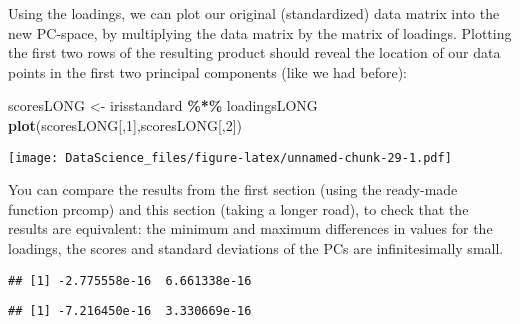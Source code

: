 \documentclass[
]{book}
\newenvironment{Shaded}{\begin{snugshade}}{\end{snugshade}}
\newcommand{\DecValTok}[1]{\textcolor[rgb]{0.00,0.00,0.81}{#1}}
\newcommand{\KeywordTok}[1]{\textcolor[rgb]{0.13,0.29,0.53}{\textbf{#1}}}
\newcommand{\NormalTok}[1]{#1}
\newcommand{\OperatorTok}[1]{\textcolor[rgb]{0.81,0.36,0.00}{\textbf{#1}}}
\newcommand{\StringTok}[1]{\textcolor[rgb]{0.31,0.60,0.02}{#1}}
\begin{document}
Using the loadings, we can plot our original (standardized) data matrix into the new PC-space, by multiplying the data matrix by the matrix of loadings. Plotting the first two rows of the resulting product should reveal the location of our data points in the first two principal components (like we had before):

\begin{Shaded}
\begin{Highlighting}[]
\NormalTok{scoresLONG \textless{}{-}}\StringTok{ }\NormalTok{irisstandard }\OperatorTok{\%*\%}\StringTok{ }\NormalTok{loadingsLONG}
\KeywordTok{plot}\NormalTok{(scoresLONG[,}\DecValTok{1}\NormalTok{],scoresLONG[,}\DecValTok{2}\NormalTok{])}
\end{Highlighting}
\end{Shaded}

\texttt{[image: DataScience\_files/figure-latex/unnamed-chunk-29-1.pdf]}

You can compare the results from the first section (using the ready-made function prcomp) and this section (taking a longer road), to check that the results are equivalent: the minimum and maximum differences in values for the loadings, the scores and standard deviations of the PCs are infinitesimally small.

\begin{Shaded}
\end{Shaded}

\begin{verbatim}
## [1] -2.775558e-16  6.661338e-16
\end{verbatim}

\begin{Shaded}
\end{Shaded}

\begin{verbatim}
## [1] -7.216450e-16  3.330669e-16
\end{verbatim}

\begin{Shaded}
\end{Shaded}
\end{document}
